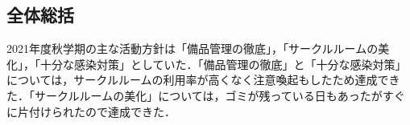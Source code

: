 \subsection*{全体総括}

2021年度秋学期の主な活動方針は「備品管理の徹底」，「サークルルームの美化」，「十分な感染対策」としていた．「備品管理の徹底」と「十分な感染対策」については，サークルルームの利用率が高くなく注意喚起もしたため達成できた．「サークルルームの美化」については，ゴミが残っている日もあったがすぐに片付けられたので達成できた．
